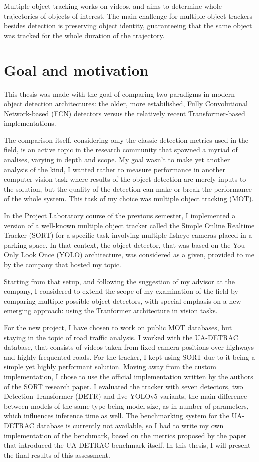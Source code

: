 Multiple object tracking works on videos, and aims to determine whole trajectories of objects of interest. The main challenge for multiple object trackers besides detection is preserving object identity, guaranteeing that the same object was tracked for the whole duration of the trajectory.

\section*{Goal and motivation}

This thesis was made with the goal of comparing two paradigms in modern object detection architectures: the older, more estabilished, Fully Convolutional Network-based (FCN) detectors versus the relatively recent Transformer-based implementations.

The comparison itself, considering only the classic detection metrics used in the field, is an active topic in the research community that spawned a myriad of analises, varying in depth and scope. My goal wasn't to make yet another analysis of the kind, I wanted rather to measure performance in another computer vision task where results of the object detection are merely inputs to the solution, but the quality of the detection can make or break the performance of the whole system. This task of my choice was multiple object tracking (MOT).

In the Project Laboratory course of the previous semester, I implemented a version of a well-known multiple object tracker called the Simple Online Realtime Tracker (SORT) for a specific task involving multiple fisheye cameras placed in a parking space. In that context, the object detector, that was based on the You Only Look Once (YOLO) architecture, was considered as a given, provided to me by the company that hosted my topic.

Starting from that setup, and following the suggestion of my advisor at the company, I considered to extend the scope of my examination of the field by comparing multiple possible object detectors, with special emphasis on a new emerging approach: using the Tranformer architecture in vision tasks.

For the new project, I have chosen to work on public MOT databases, but staying in the topic of road traffic analysis. I worked with the UA-DETRAC database, that consists of videos taken from fixed camera positions over highways and highly frequented roads. For the tracker, I kept using SORT due to it being a simple yet highly performant solution. Moving away from the custom implementation, I chose to use the official implementation written by the authors of the SORT research paper. I evaluated the tracker with seven detectors, two Detection Transformer (DETR) and five YOLOv5 variants, the main difference between models of the same type being model size, as in number of parameters, which influences inference time as well. The benchmarking system for the UA-DETRAC database is currently not available, so I had to write my own implementation of the benchmark, based on the metrics proposed by the paper that introduced the UA-DETRAC benchmark itself. In this thesis, I will present the final results of this assessment.


